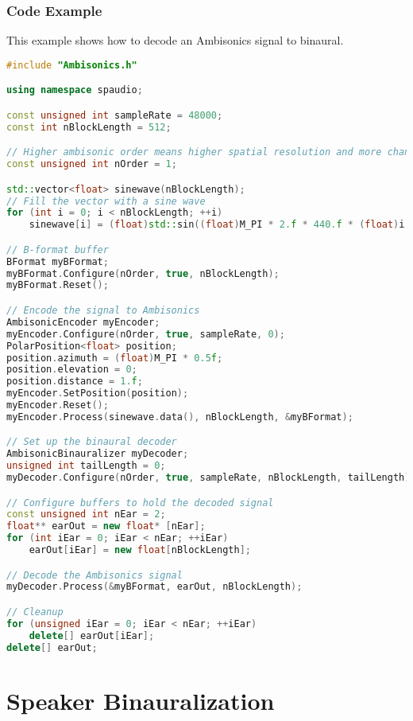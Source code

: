 \documentclass[12pt]{report}
\begin{document}
\subsection{Code Example}

This example shows how to decode an Ambisonics signal to binaural.

\begin{lstlisting}[language=C++]
#include "Ambisonics.h"

using namespace spaudio;

const unsigned int sampleRate = 48000;
const int nBlockLength = 512;

// Higher ambisonic order means higher spatial resolution and more channels required
const unsigned int nOrder = 1;

std::vector<float> sinewave(nBlockLength);
// Fill the vector with a sine wave
for (int i = 0; i < nBlockLength; ++i)
    sinewave[i] = (float)std::sin((float)M_PI * 2.f * 440.f * (float)i / (float)sampleRate);

// B-format buffer
BFormat myBFormat;
myBFormat.Configure(nOrder, true, nBlockLength);
myBFormat.Reset();

// Encode the signal to Ambisonics
AmbisonicEncoder myEncoder;
myEncoder.Configure(nOrder, true, sampleRate, 0);
PolarPosition<float> position;
position.azimuth = (float)M_PI * 0.5f;
position.elevation = 0;
position.distance = 1.f;
myEncoder.SetPosition(position);
myEncoder.Reset();
myEncoder.Process(sinewave.data(), nBlockLength, &myBFormat);

// Set up the binaural decoder
AmbisonicBinauralizer myDecoder;
unsigned int tailLength = 0;
myDecoder.Configure(nOrder, true, sampleRate, nBlockLength, tailLength);

// Configure buffers to hold the decoded signal
const unsigned int nEar = 2;
float** earOut = new float* [nEar];
for (int iEar = 0; iEar < nEar; ++iEar)
    earOut[iEar] = new float[nBlockLength];

// Decode the Ambisonics signal
myDecoder.Process(&myBFormat, earOut, nBlockLength);

// Cleanup
for (unsigned iEar = 0; iEar < nEar; ++iEar)
    delete[] earOut[iEar];
delete[] earOut;
\end{lstlisting}

\chapter{Speaker Binauralization}\label{Binauralization}
\end{document}
